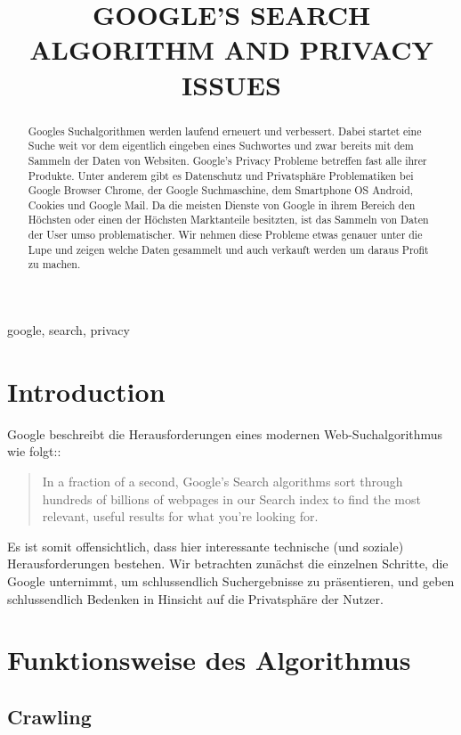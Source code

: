 \documentclass{article}
\title{GOOGLE'S SEARCH ALGORITHM AND PRIVACY ISSUES}
\begin{document}
%
\maketitle
%
\begin{abstract}
Googles Suchalgorithmen werden laufend erneuert und verbessert. Dabei startet eine Suche weit vor dem eigentlich eingeben eines Suchwortes und zwar bereits mit dem Sammeln der Daten von Websiten.
Google's Privacy Probleme betreffen fast alle ihrer Produkte. Unter anderem gibt es Datenschutz und Privatsphäre Problematiken bei Google Browser Chrome, der Google Suchmaschine, dem Smartphone OS Android, Cookies und Google Mail. Da die meisten Dienste von Google in ihrem Bereich den Höchsten oder einen der Höchsten Marktanteile besitzten, ist das Sammeln von Daten der User umso problematischer. Wir nehmen diese Probleme etwas genauer unter die Lupe und zeigen welche Daten gesammelt und auch verkauft werden um daraus Profit zu machen.
\end{abstract}
%
\begin{keywords}
google, search, privacy
\end{keywords}
%


\section{Introduction}

Google beschreibt die Herausforderungen eines modernen Web-Suchalgorithmus wie folgt:\cite{googs}:

\begin{quote}
In a fraction of a second, Google’s Search algorithms sort through hundreds of billions of webpages in our Search index to find the most relevant, useful results for what you’re looking for.
\end{quote}

Es ist somit offensichtlich, dass hier interessante technische (und soziale) Herausforderungen bestehen. Wir betrachten zunächst die einzelnen Schritte, die Google unternimmt, um schlussendlich Suchergebnisse zu präsentieren, und geben schlussendlich Bedenken in Hinsicht auf die Privatsphäre der Nutzer.

\section{Funktionsweise des Algorithmus}

\subsection{Crawling}
\end{document}

